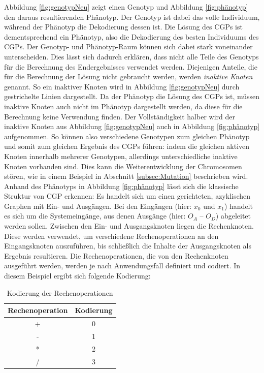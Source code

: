 Abbildung \ref{fig:genotypNeu} zeigt einen Genotyp und Abbildung \ref{fig:phänotyp} den daraus resultierenden Phänotyp.
Der Genotyp ist dabei das volle Individuum, während der Phänotyp die Dekodierung dessen ist.
Die Lösung des CGPs ist dementsprechend ein Phänotyp, also die Dekodierung des besten Individuums des CGPs.
Der Genotyp- und Phänotyp-Raum können sich dabei stark voneinander unterscheiden. \cite{eiben_introduction_2015}
Dies lässt sich dadurch erklären, dass nicht alle Teile des Genotyps für die Berechnung des Endergebnisses verwendet werden.
Diejenigen Anteile, die für die Berechnung der Lösung nicht gebraucht werden, werden \emph{inaktive Knoten} genannt.
So ein inaktiver Knoten wird in Abbildung \ref{fig:genotypNeu} durch gestrichelte Linien dargestellt.
Da der Phänotyp die Lösung des CGPs ist, müssen inaktive Knoten auch nicht im Phänotyp dargestellt werden, da diese für die Berechnung keine Verwendung finden.
Der Vollständigkeit halber wird der inaktive Knoten aus Abbildung \ref{fig:genotypNeu} auch in Abbildung \ref{fig:phänotyp} aufgenommen.
So können also verschiedene Genotypen zum gleichen Phänotyp und somit zum gleichen Ergebnis des CGPs führen: indem die gleichen aktiven Knoten innerhalb mehrerer Genotypen, allerdings unterschiedliche inaktive Knoten vorhanden sind.
Dies kann die Weiterentwicklung der Chromosomen stören, wie in einem Beispiel in Abschnitt \ref{subsec:Mutation} beschrieben wird.\\
Anhand des Phänotyps in Abbildung \ref{fig:phänotyp} lässt sich die klassische Struktur von CGP erkennen:
Es handelt sich um einen gerichteten, azyklischen Graphen mit Ein- und Ausgängen.
Bei den Eingängen (hier: $x_0$ und $x_1$) handelt es sich um die Systemeingänge, aus denen Ausgänge (hier: $O_A$ – $O_D$) abgeleitet werden sollen.
Zwischen den Ein- und Ausgangsknoten liegen die Rechenknoten.
Diese werden verwendet, um verschiedene Rechenoperationen an den Eingangsknoten auszuführen, bis schließlich die Inhalte der Ausgangsknoten als Ergebnis resultieren.
Die Rechenoperationen, die von den Rechenknoten ausgeführt werden, werden je nach Anwendungsfall definiert und codiert.
In diesem Beispiel ergibt sich folgende Kodierung:

\begin{table}[H]
    \centering
    \begin{tabular}{c | c}
       \textbf{Rechenoperation} & \textbf{Kodierung} \\ \hline
        + & 0 \\ \hline
        - & 1 \\ \hline
        * & 2 \\ \hline
        / & 3
    \end{tabular}
    \caption{Kodierung der Rechenoperationen}
    \label{table:kodierung}
\end{table}

